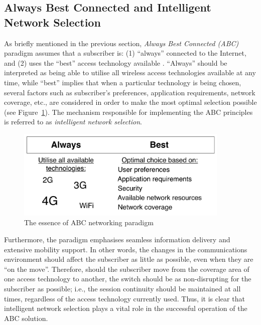 \subsection{Always Best Connected and Intelligent Network Selection} %
\label{sub:always_best_connected_and_intelligent_network_selection_intelligent}
As briefly mentioned in the previous section, \emph{Always Best Connected (ABC)} paradigm assumes that a subscriber is: (1) ``always'' connected to the Internet, and (2) uses the ``best'' access technology available \cite{ABC03}. ``Always'' should be interpreted as being able to utilise all wireless access technologies available at any time, while ``best'' implies that when a particular technology is being chosen, several factors such as subscriber's preferences, application requirements, network coverage, etc., are considered in order to make the most optimal selection possible (see Figure~\ref{fig:abc_intelligent}). The mechanism responsible for implementing the ABC principles is referred to as \emph{intelligent network selection}.

\begin{figure}[t]
    \centering
    \includegraphics[width=4in]{Intelligent/Figures/abc}
    \caption{The essence of ABC networking paradigm}
    \label{fig:abc_intelligent}
\end{figure}

Furthermore, the paradigm emphasises seamless information delivery and extensive mobility support. In other words, the changes in the communications environment should affect the subscriber as little as possible, even when they are ``on the move''. Therefore, should the subscriber move from the coverage area of one access technology to another, the switch should be as non-disrupting for the subscriber as possible; i.e., the session continuity should be maintained at all times, regardless of the access technology currently used. Thus, it is clear that intelligent network selection plays a vital role in the successful operation of the ABC solution.

